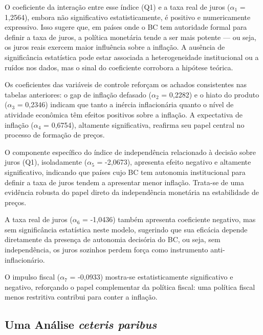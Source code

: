 \documentclass[a4paper,12pt]{article}
\begin{document}
O coeficiente da interação entre esse índice (Q1) e a taxa real de juros ($\alpha_1$ = 1,2564), embora não significativo estatisticamente, é positivo e numericamente expressivo. Isso sugere que, em países onde o BC tem autoridade formal para definir a taxa de juros, a política monetária tende a ser mais potente — ou seja, os juros reais exercem maior influência sobre a inflação. A ausência de significância estatística pode estar associada a heterogeneidade institucional ou a ruídos nos dados, mas o sinal do coeficiente corrobora a hipótese teórica.

Os coeficientes das variáveis de controle reforçam os achados consistentes nas tabelas anteriores: o gap de inflação defasado ($\alpha_2$ = 0,2282) e o hiato do produto ($\alpha_3$ = 0,2346) indicam que tanto a inércia inflacionária quanto o nível de atividade econômica têm efeitos positivos sobre a inflação. A expectativa de inflação ($\alpha_4$ = 0,6754), altamente significativa, reafirma seu papel central no processo de formação de preços.

O componente específico do índice de independência relacionado à decisão sobre juros (Q1), isoladamente ($\alpha_5$ = -2,0673), apresenta efeito negativo e altamente significativo, indicando que países cujo BC tem autonomia institucional para definir a taxa de juros tendem a apresentar menor inflação. Trata-se de uma evidência robusta do papel direto da independência monetária na estabilidade de preços.

A taxa real de juros ($\alpha_6$ = -1,0436) também apresenta coeficiente negativo, mas sem significância estatística neste modelo, sugerindo que sua eficácia depende diretamente da presença de autonomia decisória do BC, ou seja, sem independência, os juros sozinhos perdem força como instrumento anti-inflacionário.

O impulso fiscal ($\alpha_7$ = -0,0933) mostra-se estatisticamente significativo e negativo, reforçando o papel complementar da política fiscal: uma política fiscal menos restritiva contribui para conter a inflação.

\subsection*{\textbf{Uma Análise \textit{ceteris paribus}}}
\end{document}
